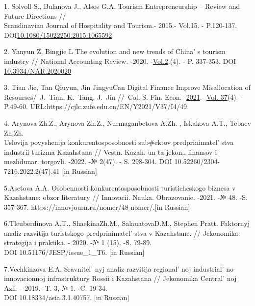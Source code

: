 \begin{references}

1. Solvoll S., Bulanova J., Alsos G.A. Tourism Entrepreneurship --
Review and Future Directions // \\Scandinavian Journal of Hospitality and
Tourism.- 2015.- Vol.15. - P.120-137. \linebreak DOI\href{http://dx.doi.org/10.1080/15022250.2015.1065592}{10.1080/15022250.2015.1065592}

2. Yanyun Z, Bingjie L The evolution and new trends of
China' s tourism industry // National Accounting Review.
-2020.
-\href{https://www.aimspress.com/nar/article/archives}{Vol.2}.(4). - P.
337-353. DOI
\href{https://doi.org/10.3934/NAR.2020020}{10.3934/NAR.2020020}

3. Tian Jie, Tan Qiuyun, Jin JingyuCan Digital Finance Improve
Misallocation of Resourses/~J.~Tian, K.~Tang, J.~Jin //~Col. S. Fin.
Econ.
-\href{https://cjlc.zufe.edu.cn/EN/article/showTenYearVolumnDetail.do?nian=2021}{2021}.
-\href{https://cjlc.zufe.edu.cn/EN/article/showTenYearVolumnDetail.do?nian=2021}{Vol.
37}{(4)}. - P.49-60. \linebreak URL:{https://cjlc.zufe.edu.cn/EN/Y2021/V37/I4/49}

4. Arynova Zh.Z., Arynova Zh.Z., Nurmaganbetova A.Zh. , Iskakova A.T.,
Tebaev Zh.Zh. \\Uslovija povyshenija konkurentosposobnosti sub\#ektov
predprinimatel' stva industrii turizma Kazahstana //
Vestn. Kazah. un-ta jekon., finansov i mezhdunar. torgovli. -2022. -№
2(47). - S. 298-304. \linebreak DOI 10.52260/2304-7216.2022.2(47).41 {[}in
Russian{]}

5.Asetova A.A. Osobennosti konkurentosposobnosti turisticheskogo biznesa
v Kazahstane: obzor literatury // Innovacii. Nauka. Obrazovanie. -2021.
-№ 48. -S. 357-367.
https://innovjourn.ru/nomer/48-nomer/.{[}in Russian{]}

6.Tleuberdinova A.T., ShaekinaZh.M., SalauatovaD.M., Stephen Pratt.
Faktornyj analiz razvitija turistskogo
predprinimatel' stva v Kazahstane. // Jekonomika:
strategija i praktika. - 2020. -№ 1 (15). -S. 79-89. \\DOI
10.51176/JESP/issue\_1\_T6. {[}in Russian{]}

7.Vechkinzova E.A. Sravnitel' nyj analiz razvitija
regional' noj industrial' no-innovacionnoj
infrastruktury Rossii i Kazahstana // Jekonomika
Central' noj Azii. - 2019. -T. 3,-№ 1. -C. 19-34. \\DOI
10.18334/asia.3.1.40757. {[}in Russian{]}


\end{references}
